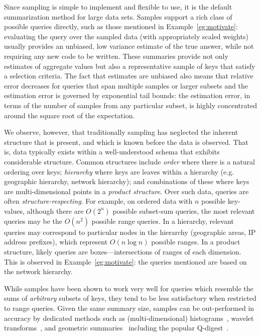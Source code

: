 \documentclass[11pt]{article}
\begin{document}
Since sampling is simple to implement and flexible to use, it is
 the default summarization method for large data sets. 
Samples support a rich class of possible queries directly, such as
those mentioned in Example~\ref{eg:motivate}:
evaluating the query over the sampled data (with appropriately
scaled weights) usually provides an unbiased, low variance estimate of
the true answer, while not requiring any new code to be written. 
These summaries provide not only estimates of aggregate
values but also a representative sample of keys that satisfy a
selection criteria.  
The fact that estimates are unbiased also means that relative
error decreases for queries that span multiple
samples or larger subsets and the estimation error is governed by
exponential tail bounds:  the estimation error, in terms of the number
of samples from any particular subset, is highly concentrated around
the square root of the expectation.

We observe, however, that traditionally sampling
has neglected the inherent structure that is present,
 and which is known before the data is observed. 
That is, data typically exists within a well-understood schema 
that exhibits considerable structure. 
Common structures include {\em order} where there is a natural ordering
over keys; {\em hierarchy} where keys are leaves within a hierarchy
(e.g. geographic hierarchy, network hierarchy); and
combinations of these where keys are multi-dimensional points in a 
{\em product structure}.
Over such data, queries are often {\em structure-respecting}.  
For example, on ordered data with $n$ possible key-values, 
although there are $O(2^n)$ possible subset-sum queries, 
the most relevant queries may be the $O(n^2)$ possible range queries. 
In a hierarchy, relevant queries may correspond to particular nodes 
in the hierarchy
(geographic areas, IP address prefixes), which represent
$O(n\log n)$ possible ranges. In a product structure, likely queries are 
boxes---intersections of ranges of each dimension. 
This is observed in Example~\ref{eg:motivate}: the queries mentioned
are based on the network hierarchy. 

While samples have been shown to work very well for queries which
resemble the sums of {\em arbitrary} subsets of keys, 
they tend to be less satisfactory when restricted to range queries. 
Given the same summary size, samples can be out-performed in
accuracy by dedicated methods such as 
(multi-dimensional) histograms~\cite{GKTD:sigmod2000,PoosalaIoannidis:VLDB97,LKC:sigmod1999},
wavelet
transforms~\cite{Matias98wavelet-basedhistograms,Vitter98datacube},
and geometric
summaries~\cite{SuriTZ:CG2004,HSST:ISAAC04,BCEG:ToA2007,HHH:CKMS:TKDD2008,ZSSDC:IMC04}
including the popular 
Q-digest~\cite{ShrivastavaBAS:sensys04}.
\end{document}
